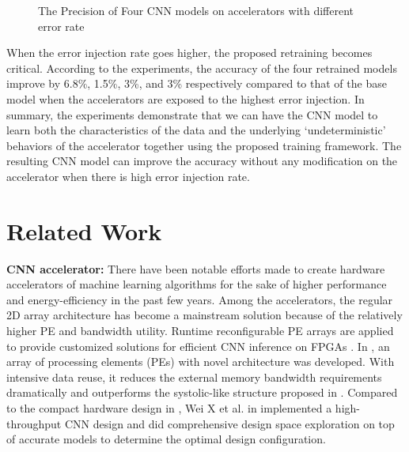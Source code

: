 \begin{figure}
        \center
        \qquad
        \qquad
        \qquad
        \caption{The Precision of Four CNN models on accelerators with different error rate}
        \label{fig:softerror accuracy}
\end{figure}


  When the error injection rate goes higher, the proposed retraining becomes critical. 
According to the experiments, the accuracy of the four retrained models improve by 6.8\%, 1.5\%, 3\%, and 3\% 
respectively compared to that of the base model when the accelerators are exposed to the highest 
error injection. In summary, the experiments demonstrate that we can have the CNN model to learn 
both the characteristics of the data and the underlying ‘undeterministic’ behaviors of the accelerator 
together using the proposed training framework. The resulting CNN model can improve the accuracy 
without any modification on the accelerator when there is high error injection rate.  

\section{Related Work} \label{sec:relatedwork}
\textbf{CNN accelerator:} There have been notable efforts made to create hardware accelerators of 
machine learning algorithms for the sake of higher performance and energy-efficiency \cite{Cnvlutin_25} 
in the past few years. Among the accelerators, the regular 2D array architecture has become 
a mainstream solution because of the relatively higher PE and bandwidth utility. Runtime reconfigurable 
PE arrays are applied to provide customized solutions for efficient CNN inference on FPGAs \cite{Caffeine_6,deepburing_12}. 
In \cite{Aydonat_27}, an array of processing elements (PEs) with novel architecture was developed. With intensive 
data reuse, it reduces the external memory bandwidth requirements dramatically and outperforms 
the systolic-like structure proposed in \cite{Caffeine_6}. Compared to the compact hardware design in \cite{Caffeine_6,Aydonat_27}, 
Wei X et al. in \cite{Wei_29} implemented a high-throughput CNN design and did comprehensive design space exploration 
on top of accurate models to determine the optimal design configuration.


